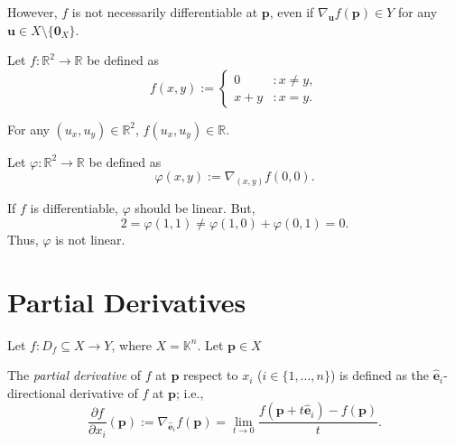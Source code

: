 \documentclass{article}
\begin{document}
\begin{example}
	However, $f$ is not necessarily differentiable at $\mathbf p$, even if $\nabla_{\mathbf u} f(\mathbf p) \in Y$ for any $\mathbf u \in X \setminus \{\mathbf 0_X\}$.
	
	Let $f: \mathbb R^2 \to \mathbb R$ be defined as
	$$
	f(x,y) :=
	\begin{cases}
		0 & : x\ne y, \\
		x+ y & : x= y.
	\end{cases}
	$$
	
	For any $(u_x, u_y) \in \mathbb R^2$, $f(u_x, u_y) \in \mathbb R$.
	
	Let $\varphi: \mathbb R^2 \to \mathbb R$ be defined as
	$$
	\varphi(x,y) := \nabla_{(x,y)} f(0,0).
	$$
	
	If $f$ is differentiable, $\varphi$ should be linear. But,
	$$
	2 = \varphi(1,1) \ne \varphi(1,0) + \varphi(0,1) = 0.
	$$
	Thus, $\varphi$ is not linear.
\end{example}


\section{Partial Derivatives}


\begin{definition}
	Let $f: D_f \subseteq X \to Y$, where $X = \mathbb K^n$. Let $\mathbf p \in X$
	
	The \textit{partial derivative} of $f$ at $\mathbf p$ respect to $x_i$ ($i \in \{1, \ldots, n\}$) is defined as the $\mathbf{\hat e}_i$-directional derivative of $f$ at $\mathbf p$; i.e.,
	$$
	\frac{\partial f}{\partial x_i}(\mathbf p) := \nabla_{\mathbf{\hat e}_i} f(\mathbf p) = \lim_{t \to 0} \frac{f(\mathbf p + t \mathbf{\hat e}_i) - f(\mathbf p)}{t}.
	$$
\end{definition}
\end{document}
